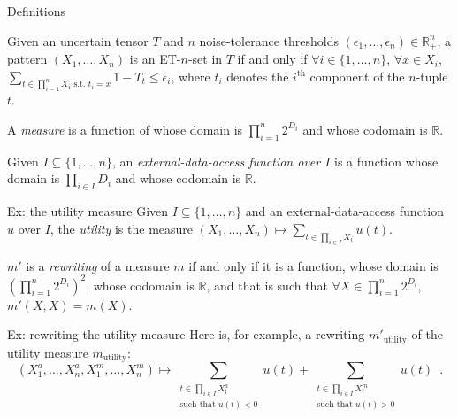 \documentclass{beamer}
\begin{document}
\begin{frame}[allowframebreaks]{Definitions}
  \begin{definition}[ET-$n$-set]
  Given an uncertain tensor $T$ and $n$ noise-tolerance thresholds
  $(\epsilon_1, \dots, \epsilon_n) \in \mathbb{R}_+^n$, a pattern
  $(X_1, \dots, X_n)$ is an ET-$n$-set in $T$ if and only if $\forall i
  \in \{1, \dots, n\}$, $\forall x \in X_i$, $\sum_{t \in \prod_{i =
      1}^n X_i\text{ s.t. }t_i = x} 1 - T_t \leq \epsilon_i$, where
  $t_i$ denotes the $i^{\text{th}}$ component of the $n$-tuple $t$.
  \end{definition}
  
  \begin{definition}[Measure]
  \label{def:measure}
  A \emph{measure} is a function of whose domain is $\prod_{i = 1}^n
  2^{D_i}$ and whose codomain is $\mathbb{R}$.
  \end{definition}

\framebreak  
  \begin{definition}
  Given $I \subseteq \{1, \dots, n\}$, an \emph{external-data-access
    function over $I$} is a function whose domain is $\prod_{i \in I}
  D_i$ and whose codomain is $\mathbb{R}$.
  \end{definition}

  \begin{block}{Ex: the utility measure}
  Given $I \subseteq \{1, \dots, n\}$ and an external-data-access
  function $u$ over $I$, the \emph{utility} is the measure $(X_1,
  \dots, X_n) \mapsto \sum_{t \in \prod_{i \in I} X_i} u(t)$.
  \end{block}
  
\framebreak
  \begin{definition}[Rewriting]
  $m'$ is a \emph{rewriting} of a measure $m$ if and only if it is a
  function, whose domain is $\left(\prod_{i = 1}^n 2^{D_i}\right)^2$,
  whose codomain is $\mathbb{R}$, and that is such that $\forall X \in
  \prod_{i = 1}^n 2^{D_i}$, $m'(X, X) = m(X)$.
  \end{definition}
  
   \begin{block}{Ex: rewriting the utility measure}
  Here is, for example, a rewriting $m'_{\text{utility}}$ of the utility
measure $m_{\text{utility}}$:
  \begin{equation*}
  (X^a_1, \dots, X^a_n, X^m_1, \dots, X^m_n) \mapsto \sum_{\substack{t
      \in \prod_{i \in I} X_i^a\\\text{such that }u(t) < 0}} u(t) +
  \sum_{\substack{t \in \prod_{i \in I}X_i^m\\\text{such that }u(t) >
      0}} u(t) \enspace .
  \end{equation*}
  \end{block}
  

\end{frame}
\end{document}
